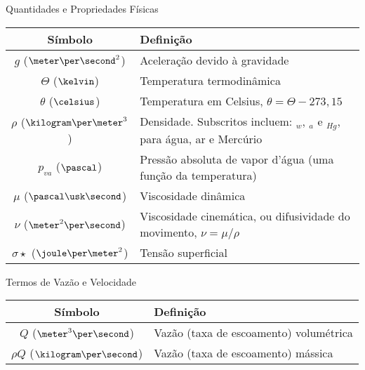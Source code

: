     \begin{frame}{Quantidades e Propriedades Físicas}\vspace*{-1em}

        \setlength{\tabcolsep}{2mm}
        \noindent\begin{longtable}{cp{110mm}}
            \alert{Símbolo} & \alert{Definição} \\
            \hline
            $g$ ($\meter\per\second^2$) &
            Aceleração devido à gravidade \\
            $\Theta$ ($\kelvin$) &
            Temperatura termodinâmica \\
            $\theta$ ($\celsius$) &
            Temperatura em Celsius, \alert{$\theta = \Theta - 273,15$} \\
            $\rho$ ($\kilogram\per\meter^3$) &
            Densidade. Subscritos incluem: \alert{$_w$}, \alert{$_a$} e \alert{$_{Hg}$}, para
            água, ar e Mercúrio \\
            $p_{va}$ ($\pascal$) &
            Pressão absoluta de vapor d'água (uma função da temperatura) \\
            $\mu$ ($\pascal\usk\second$) &
            Viscosidade dinâmica \\
            $\nu$ ($\meter^2\per\second$) &
            Viscosidade cinemática, ou difusividade do movimento, \alert{$\nu = \mu/\rho$} \\
            $\sigma\star$ ($\joule\per\meter^2$) &
            Tensão superficial \\
            \hline
        \end{longtable}

    \end{frame}

    \begin{frame}{Termos de Vazão e Velocidade}\vspace*{-1em}

        \setlength{\tabcolsep}{2mm}
        \noindent\begin{longtable}{cp{110mm}}
            \alert{Símbolo} & \alert{Definição} \\
            \hline
            $Q$ ($\meter^3\per\second$) &
            Vazão (taxa de escoamento) volumétrica \\
            $\rho Q$ ($\kilogram\per\second$) &
            Vazão (taxa de escoamento) mássica \\

            \hline
        \end{longtable}

    \end{frame}

